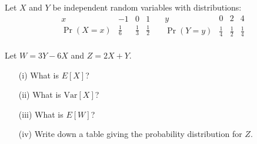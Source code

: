 \begin{exercise}
Let $X$ and $Y$ be independent random variables with distributions:
\[
\begin{array}{c|ccc}
x & -1 & 0 & 1 \\
\hline
\Pr(X = x) & \frac{1}{6} & \frac{1}{3} & \frac{1}{2} \\
\end{array}
\quad
\begin{array}{c|cccc}
y & 0 & 2 & 4 \\
\hline
\Pr(Y = y) & \frac{1}{4} & \frac{1}{2} & \frac{1}{4} \\
\end{array}
\]

Let $W = 3Y - 6X$ and $Z = 2X + Y$.

\begin{enumerate}
    \item[(i)] What is ${E}[X]$?
    \item[(ii)] What is $\mathrm{Var}[X]$?
    \item[(iii)] What is ${E}[W]$?
    \item[(iv)] Write down a table giving the probability distribution for $Z$.
\end{enumerate}
\end{exercise}


